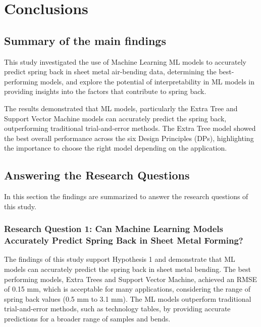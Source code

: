 \chapter{Conclusions}\label{ch:conclusions}


\section{Summary of the main findings}\label{sec:summary-of-the-main-findings}
This study investigated the use of Machine Learning \ac{ML} models to accurately predict spring back in sheet metal
air-bending data, determining the best-performing models, and explore the potential of interpretability in ML models in
providing insights into the factors that contribute to spring back.

The results demonstrated that ML models, particularly the Extra Tree and Support Vector Machine models can accurately
predict the spring back, outperforming traditional trial-and-error methods.
The Extra Tree model showed the best overall performance across the six Design Principles (DPs), highlighting the
importance to choose the right model depending on the application.


\section{Answering the Research Questions}\label{sec:answering-the-research-question}
In this section the findings are summarized to answer the research questions of this study.

\subsection{Research Question 1: Can Machine Learning Models Accurately Predict Spring Back in Sheet Metal Forming?}
\label{subsec:research-question-1:-can-machine-learning-models-accurately-predict-spring-back-in-sheet-metal-forming?}

The findings of this study support Hypothesis 1 and demonstrate that \ac{ML} models can accurately predict the spring
back in sheet metal bending.
The best performing models, Extra Trees and Support Vector Machine, achieved an RMSE of 0.15 mm, which is acceptable
for many applications, considering the range of spring back values (0.5 mm to 3.1 mm).
The \ac{ML} models outperform traditional trial-and-error methods, such as technology tables, by providing accurate
predictions for a broader range of samples and bends.

